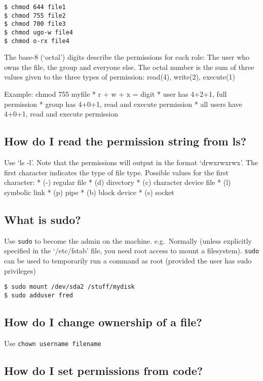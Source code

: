\begin{verbatim}
$ chmod 644 file1
$ chmod 755 file2
$ chmod 700 file3
$ chmod ugo-w file4
$ chmod o-rx file4
\end{verbatim}

The base-8 (`octal') digits describe the permissions for each role: The
user who owns the file, the group and everyone else. The octal number is
the sum of three values given to the three types of permission: read(4),
write(2), execute(1)

Example: chmod 755 myfile * r + w + x = digit * user has 4+2+1, full
permission * group has 4+0+1, read and execute permission * all users
have 4+0+1, read and execute permission

\subsection{How do I read the permission string from
ls?}\label{how-do-i-read-the-permission-string-from-ls}

Use `ls -l'. Note that the permissions will output in the format
`drwxrwxrwx'. The first character indicates the type of file type.
Possible values for the first character: * (-) regular file * (d)
directory * (c) character device file * (l) symbolic link * (p) pipe *
(b) block device * (s) socket

\subsection{What is sudo?}\label{what-is-sudo}

Use \texttt{sudo} to become the admin on the machine. e.g.~Normally
(unless explicitly specified in the `/etc/fstab' file, you need root
access to mount a filesystem). \texttt{sudo} can be used to temporarily
run a command as root (provided the user has sudo privileges)

\begin{verbatim}
$ sudo mount /dev/sda2 /stuff/mydisk
$ sudo adduser fred
\end{verbatim}

\subsection{How do I change ownership of a
file?}\label{how-do-i-change-ownership-of-a-file}

Use \texttt{chown\ username\ filename}

\subsection{How do I set permissions from
code?}\label{how-do-i-set-permissions-from-code}

